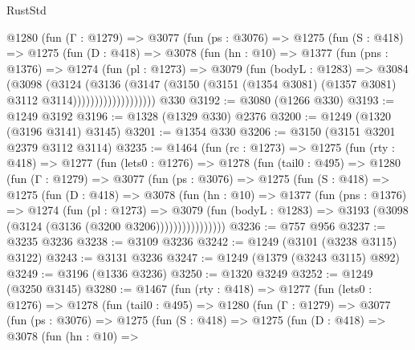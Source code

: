 \begin{lexlean}{RustStd}
\begin{coremodule}
            @1280
              (fun (Γ : @1279) =>
              @3077
                (fun (ps : @3076) =>
                @1275
                  (fun (S : @418) =>
                  @1275
                    (fun (D : @418) =>
                    @3078
                      (fun (hn : @10) =>
                      @1377
                        (fun (pns : @1376) =>
                        @1274
                          (fun (pl : @1273) =>
                          @3079
                            (fun (bodyL : @1283) =>
                            @3084
                              (@3098
                                (@3124
                                  (@3136
                                    (@3147
                                      (@3150
                                        (@3151
                                          (@1354 @3081)
                                          (@1357 @3081)
                                          @3112
                                          @3114)))))))))))))))))))
    @330
@3192 := @3080 (@1266 @330)
@3193 := @1249 @3192
@3196 := @1328 (@1329 @330) @2376
@3200 := @1249 (@1320 (@3196 @3141) @3145)
@3201 := @1354 @330
@3206 := @3150 (@3151 @3201 @2379 @3112 @3114)
@3235 := @1464
    (fun (rc : @1273) =>
    @1275
      (fun (rty : @418) =>
      @1277
        (fun (lets0 : @1276) =>
        @1278
          (fun (tail0 : @495) =>
          @1280
            (fun (Γ : @1279) =>
            @3077
              (fun (ps : @3076) =>
              @1275
                (fun (S : @418) =>
                @1275
                  (fun (D : @418) =>
                  @3078
                    (fun (hn : @10) =>
                    @1377
                      (fun (pns : @1376) =>
                      @1274
                        (fun (pl : @1273) =>
                        @3079
                          (fun (bodyL : @1283) =>
                          @3193 (@3098 (@3124 (@3136 (@3200 @3206))))))))))))))))
@3236 := @757 @956
@3237 := @3235 @3236
@3238 := @3109 @3236
@3242 := @1249 (@3101 (@3238 @3115) @3122)
@3243 := @3131 @3236
@3247 := @1249 (@1379 (@3243 @3115) @892)
@3249 := @3196 (@1336 @3236)
@3250 := @1320 @3249
@3252 := @1249 (@3250 @3145)
@3280 := @1467
    (fun (rty : @418) =>
    @1277
      (fun (lets0 : @1276) =>
      @1278
        (fun (tail0 : @495) =>
        @1280
          (fun (Γ : @1279) =>
          @3077
            (fun (ps : @3076) =>
            @1275
              (fun (S : @418) =>
              @1275
                (fun (D : @418) =>
                @3078
                  (fun (hn : @10) =>

\end{coremodule}
\end{lexlean}
